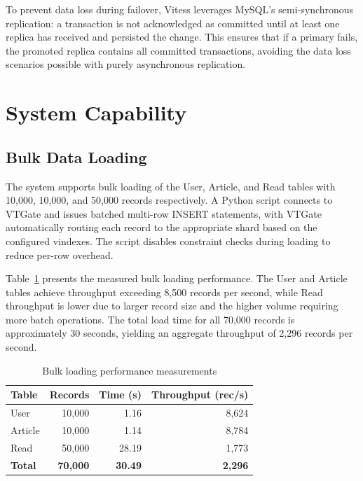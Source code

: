 \documentclass{article}
\begin{document}
To prevent data loss during failover, Vitess leverages MySQL's semi-synchronous replication: a transaction is not acknowledged as committed until at least one replica has received and persisted the change. This ensures that if a primary fails, the promoted replica contains all committed transactions, avoiding the data loss scenarios possible with purely asynchronous replication.

\section{System Capability}

\subsection{Bulk Data Loading}

The system supports bulk loading of the User, Article, and Read tables with 10,000, 10,000, and 50,000 records respectively. A Python script connects to VTGate and issues batched multi-row INSERT statements, with VTGate automatically routing each record to the appropriate shard based on the configured vindexes. The script disables constraint checks during loading to reduce per-row overhead.

Table~\ref{tab:bulk-load-performance} presents the measured bulk loading performance. The User and Article tables achieve throughput exceeding 8,500 records per second, while Read throughput is lower due to larger record size and the higher volume requiring more batch operations. The total load time for all 70,000 records is approximately 30 seconds, yielding an aggregate throughput of 2,296 records per second.

\begin{table}[htbp]
\centering
\caption{Bulk loading performance measurements}
\label{tab:bulk-load-performance}
\begin{tabular}{|l|r|r|r|}
\hline
\textbf{Table} & \textbf{Records} & \textbf{Time (s)} & \textbf{Throughput (rec/s)} \\
\hline
User & 10,000 & 1.16 & 8,624 \\
Article & 10,000 & 1.14 & 8,784 \\
Read & 50,000 & 28.19 & 1,773 \\
\hline
\textbf{Total} & \textbf{70,000} & \textbf{30.49} & \textbf{2,296} \\
\hline
\end{tabular}
\end{table}
\end{document}
